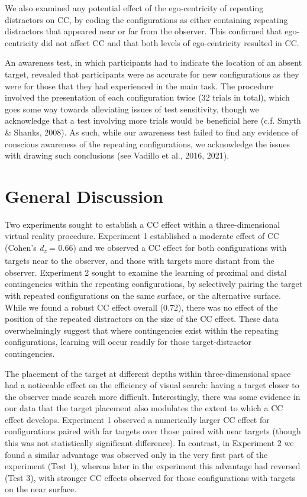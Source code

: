 \documentclass[
  english,
  man,floatsintext]{apa7}
\begin{document}
We also examined any potential effect of the ego-centricity of repeating distractors on CC, by coding the configurations as either containing repeating distractors that appeared near or far from the observer. This confirmed that ego-centricity did not affect CC and that both levels of ego-centricity resulted in CC.

An awareness test, in which participants had to indicate the location of an absent target, revealed that participants were as accurate for new configurations as they were for those that they had experienced in the main task. The procedure involved the presentation of each configuration twice (32 trials in total), which goes some way towards alleviating issues of test sensitivity, though we acknowledge that a test involving more trials would be beneficial here (c.f. Smyth \& Shanks, 2008). As such, while our awareness test failed to find any evidence of conscious awareness of the repeating configurations, we acknowledge the issues with drawing such conclusions (see Vadillo et al., 2016, 2021).

\hypertarget{general-discussion}{%
\section{General Discussion}\label{general-discussion}}

Two experiments sought to establish a CC effect within a three-dimensional virtual reality procedure. Experiment 1 established a moderate effect of CC (Cohen's \emph{d\textsubscript{z}} = 0.66) and we observed a CC effect for both configurations with targets near to the observer, and those with targets more distant from the observer. Experiment 2 sought to examine the learning of proximal and distal contingencies within the repeating configurations, by selectively pairing the target with repeated configurations on the same surface, or the alternative surface. While we found a robust CC effect overall (0.72), there was no effect of the position of the repeated distractors on the size of the CC effect. These data overwhelmingly suggest that where contingencies exist within the repeating configurations, learning will occur readily for those target-distractor contingencies.

The placement of the target at different depths within three-dimensional space had a noticeable effect on the efficiency of visual search: having a target closer to the observer made search more difficult. Interestingly, there was some evidence in our data that the target placement also modulates the extent to which a CC effect develops. Experiment 1 observed a numerically larger CC effect for configurations paired with far targets over those paired with near targets (though this was not statistically significant difference). In contrast, in Experiment 2 we found a similar advantage was observed only in the very first part of the experiment (Test 1), whereas later in the experiment this advantage had reversed (Test 3), with stronger CC effects observed for those configurations with targets on the near surface.
\end{document}
